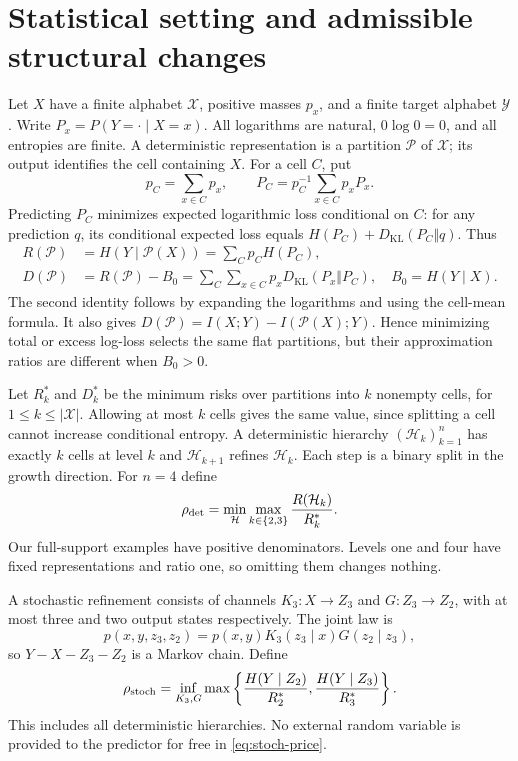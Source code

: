 \documentclass[11pt]{article}
\theoremstyle{remark}\newtheorem{remark}[theorem]{Remark}
\newcommand{\KL}{D_{\mathrm{KL}}}
\newcommand{\cP}{\mathcal P}
\newcommand{\cH}{\mathcal H}
\begin{document}
\section{Statistical setting and admissible structural changes}
Let $X$ have a finite alphabet $\mathcal X$, positive masses $p_x$, and a
finite target alphabet $\mathcal Y$. Write $P_x=P(Y=\cdot\mid X=x)$.
All logarithms are natural, $0\log0=0$, and all entropies are finite.
A deterministic representation is a partition $\cP$ of $\mathcal X$;
its output identifies the cell containing $X$. For a cell $C$, put
\[
 p_C=\sum_{x\in C}p_x,\qquad
 P_C=p_C^{-1}\sum_{x\in C}p_xP_x.
\]
Predicting $P_C$ minimizes expected logarithmic loss conditional on $C$:
for any prediction $q$, its conditional expected loss equals
$H(P_C)+\KL(P_C\Vert q)$. Thus
\begin{align}
 R(\cP)&=H(Y\mid\cP(X))=\sum_C p_C H(P_C),\label{eq:risk}\\
 D(\cP)&=R(\cP)-B_0
   =\sum_C\sum_{x\in C}p_x\KL(P_x\Vert P_C),
 \quad B_0=H(Y\mid X).\label{eq:distortion}
\end{align}
The second identity follows by expanding the logarithms and using the
cell-mean formula. It also gives
$D(\cP)=I(X;Y)-I(\cP(X);Y)$. Hence minimizing total or excess
log-loss selects the same flat partitions, but their approximation ratios
are different when $B_0>0$.

Let $R_k^*$ and $D_k^*$ be the minimum risks over partitions into $k$
nonempty cells, for $1\le k\le |\mathcal X|$. Allowing at most $k$
cells gives the same value, since splitting a cell cannot increase
conditional entropy. A deterministic hierarchy $(\cH_k)_{k=1}^n$
has exactly $k$ cells at level $k$ and $\cH_{k+1}$ refines $\cH_k$.
Each step is a binary split in the growth direction. For $n=4$ define
\begin{equation}
 \rho_{\rm det}
 =\min_{\cH}\max_{k\in\{2,3\}}\frac{R(\cH_k)}{R_k^*}.
 \label{eq:det-price}
\end{equation}
Our full-support examples have positive denominators. Levels one and four
have fixed representations and ratio one, so omitting them changes nothing.

A stochastic refinement consists of channels $K_3:X\to Z_3$ and
$G:Z_3\to Z_2$, with at most three and two output states respectively.
The joint law is
\begin{equation}
 p(x,y,z_3,z_2)=p(x,y)K_3(z_3\mid x)G(z_2\mid z_3),
 \label{eq:markov}
\end{equation}
so $Y-X-Z_3-Z_2$ is a Markov chain. Define
\begin{equation}
 \rho_{\rm stoch}
 =\inf_{K_3,G}\max\left\{
 \frac{H(Y\mid Z_2)}{R_2^*},
 \frac{H(Y\mid Z_3)}{R_3^*}\right\}.
 \label{eq:stoch-price}
\end{equation}
This includes all deterministic hierarchies. No external random variable is
provided to the predictor for free in \eqref{eq:stoch-price}.
\end{document}
